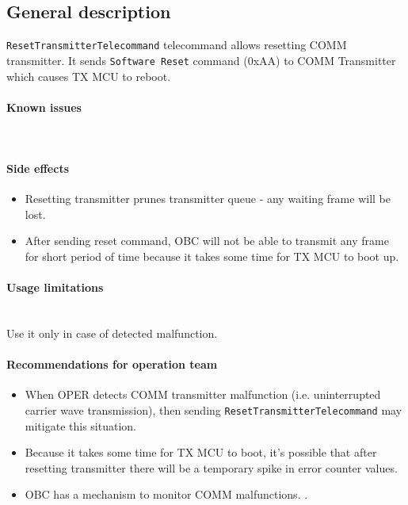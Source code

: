 

\subsection{General description}
\texttt{ResetTransmitterTelecommand} telecommand allows resetting COMM transmitter. It sends \texttt{Software Reset} command (0xAA) to COMM Transmitter which causes TX MCU to reboot.

\paragraph{Known issues} \mbox{} \\
\None

\paragraph{Side effects}
\begin{itemize}
	\item Resetting transmitter prunes transmitter queue - any waiting frame will be lost.
	\item After sending reset command, OBC will not be able to transmit any frame for short period of time because it takes some time for TX MCU to boot up. 	
\end{itemize}

\paragraph{Usage limitations} \mbox{} \\
Use it only in case of detected malfunction.

\paragraph{Recommendations for operation team}
\begin{itemize}
	\item When OPER detects COMM transmitter malfunction (i.e. uninterrupted carrier wave transmission), then sending \texttt{ResetTransmitterTelecommand} may mitigate this situation.
	\item Because it takes some time for TX MCU to boot, it's possible that after resetting transmitter there will be a temporary spike in error counter values.
	\item OBC has a mechanism to monitor COMM malfunctions. .
\end{itemize}

